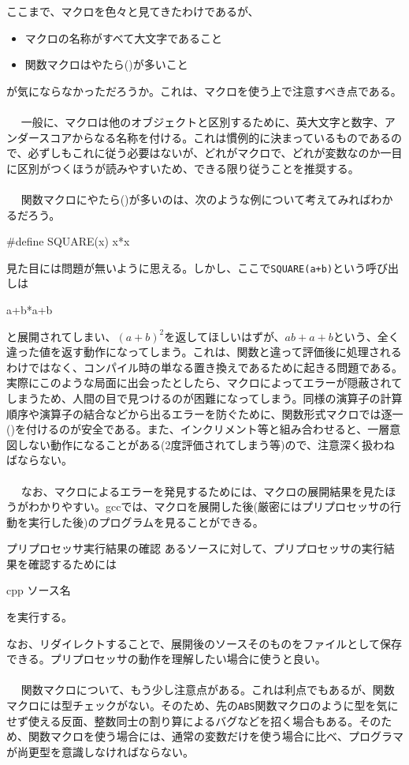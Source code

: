 ここまで、マクロを色々と見てきたわけであるが、
\begin{itemize}
\item マクロの名称がすべて大文字であること
\item 関数マクロはやたら()が多いこと
\end{itemize}
が気にならなかっただろうか。これは、マクロを使う上で注意すべき点である。
\\ \\　
一般に、マクロは他のオブジェクトと区別するために、英大文字と数字、アンダースコアからなる名称を付ける。これは慣例的に決まっているものであるので、必ずしもこれに従う必要はないが、どれがマクロで、どれが変数なのか一目に区別がつくほうが読みやすいため、できる限り従うことを推奨する。
\\ \\　
関数マクロにやたら()が多いのは、次のような例について考えてみればわかるだろう。
\begin{code}
#define SQUARE(x) x*x
\end{code}
見た目には問題が無いように思える。しかし、ここで\verb|SQUARE(a+b)|という呼び出しは
\begin{code}
a+b*a+b
\end{code}
と展開されてしまい、$(a+b)^2$を返してほしいはずが、$ab+a+b$という、全く違った値を返す動作になってしまう。これは、関数と違って評価後に処理されるわけではなく、コンパイル時の単なる置き換えであるために起きる問題である。実際にこのような局面に出会ったとしたら、マクロによってエラーが隠蔽されてしまうため、人間の目で見つけるのが困難になってしまう。同様の演算子の計算順序や演算子の結合などから出るエラーを防ぐために、関数形式マクロでは逐一()を付けるのが安全である。また、インクリメント等と組み合わせると、一層意図しない動作になることがある(2度評価されてしまう等)ので、注意深く扱わねばならない。
\\ \\　
なお、マクロによるエラーを発見するためには、マクロの展開結果を見たほうがわかりやすい。gccでは、マクロを展開した後(厳密にはプリプロセッサの行動を実行した後)のプログラムを見ることができる。
\begin{itembox}[l]{プリプロセッサ実行結果の確認}
あるソースに対して、プリプロセッサの実行結果を確認するためには
\begin{code}
cpp ソース名
\end{code}
を実行する。
\end{itembox}
なお、リダイレクトすることで、展開後のソースそのものをファイルとして保存できる。プリプロセッサの動作を理解したい場合に使うと良い。
\\ \\　
関数マクロについて、もう少し注意点がある。これは利点でもあるが、関数マクロには型チェックがない。そのため、先の\verb|ABS|関数マクロのように型を気にせず使える反面、整数同士の割り算によるバグなどを招く場合もある。そのため、関数マクロを使う場合には、通常の変数だけを使う場合に比べ、プログラマが尚更型を意識しなければならない。

